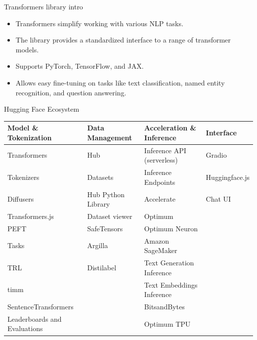 \documentclass{beamer}
\begin{document}
\begin{frame}{Transformers library intro}
    \begin{itemize}
        \item Transformers simplify working with various NLP tasks.
        \item The library provides a standardized interface to a range of transformer models.
        \item Supports PyTorch, TensorFlow, and JAX.
        \item Allows easy fine-tuning on tasks like text classification, named entity recognition, and question answering.
    \end{itemize}
\end{frame}

\begin{frame}{Hugging Face Ecosystem}
    \scriptsize
    \centering %
    \begin{tabular}{|p{2.5cm}|p{2.5cm}|p{2.5cm}|p{2.5cm}|}
        \hline
        \textbf{Model \& Tokenization} & \textbf{Data Management} & \textbf{Acceleration \& Inference} & \textbf{Interface} \\
        \hline
        Transformers & Hub & Inference API (serverless) & Gradio \\
        Tokenizers & Datasets & Inference Endpoints & Huggingface.js \\
        Diffusers & Hub Python Library & Accelerate & Chat UI \\
        Transformers.js & Dataset viewer & Optimum & \\
        PEFT & SafeTensors & Optimum Neuron & \\
        Tasks & Argilla & Amazon SageMaker & \\
        TRL & Distilabel & Text Generation Inference & \\
        timm &  & Text Embeddings Inference & \\
        SentenceTransformers &  & BitsandBytes & \\
        Leaderboards and Evaluations &  & Optimum TPU & \\
        \hline
    \end{tabular}
\end{frame}
\end{document}
